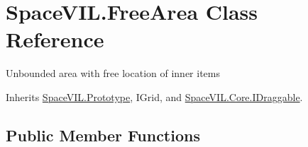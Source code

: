\hypertarget{class_space_v_i_l_1_1_free_area}{}\section{Space\+V\+I\+L.\+Free\+Area Class Reference}
\label{class_space_v_i_l_1_1_free_area}


Unbounded area with free location of inner items  




Inherits \mbox{\hyperlink{class_space_v_i_l_1_1_prototype}{Space\+V\+I\+L.\+Prototype}}, I\+Grid, and \mbox{\hyperlink{interface_space_v_i_l_1_1_core_1_1_i_draggable}{Space\+V\+I\+L.\+Core.\+I\+Draggable}}.

\subsection*{Public Member Functions}
